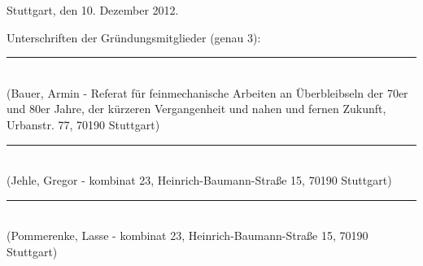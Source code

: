 \documentclass[a4paper]{article}
\begin{document}
\bigskip 

Stuttgart, den 10. Dezember 2012.

\medskip 

Unterschriften der Gründungsmitglieder (genau 3):


\newcommand{\signature}[1]{
\rule[-1.5cm]{11.5cm}{1pt}\\
\hspace*{13pt}({#1})
}


\signature{Bauer, Armin - Referat für feinmechanische Arbeiten an Überbleibseln der 70er und 80er Jahre, der kürzeren Vergangenheit und nahen und fernen Zukunft, Urbanstr. 77, 70190 Stuttgart}

\signature{Jehle, Gregor - kombinat 23, Heinrich-Baumann-Straße 15, 70190 Stuttgart}

\signature{Pommerenke, Lasse - kombinat 23, Heinrich-Baumann-Straße 15, 70190 Stuttgart}
\end{document}
